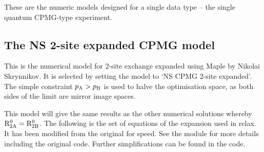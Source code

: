 These are the numeric models designed for a single data type -- the single quantum CPMG-type experiment.



\subsection{The NS 2-site expanded CPMG model}
\label{sect: dispersion: NS CPMG 2-site expanded model}

This is the numerical model for 2-site exchange expanded using Maple by Nikolai Skrynnikov.
It is selected by setting the model to `NS CPMG 2-site expanded'.
The simple constraint $p_{\textrm{A}} > p_{\textrm{B}}$ is used to halve the optimisation space, as both sides of the limit are mirror image spaces.

This model will give the same results as the other numerical solutions whereby $\mathrm{R}_{\mathrm{2A}}^0 = \mathrm{R}_{\mathrm{2B}}^0$.
The following is the set of equations of the expansion used in relax.
It has been modified from the original for speed.
See the  module for more details including the original code.
Further simplifications can be found in the code.

